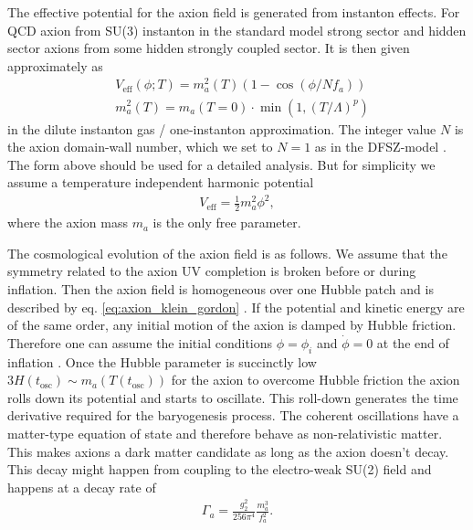 \documentclass[13pt,a4paper,titlepage]{article}
\begin{document}
The effective potential for the axion field is generated from instanton effects.
For QCD axion from SU(3) instanton in the standard model strong sector and hidden sector axions from some hidden strongly coupled sector. It is then given approximately as \cite[sec. 2.2]{Axion_Cosmology_Marsh_2016}
\begin{align}
   &V_\mathrm{eff}(\phi; T) = m_a^2(T) (1 - \cos(\phi / N f_a)) \\
   &m_a^2(T) = m_a(T = 0) \cdot \min\left(1, \left( T / \Lambda \right)^p \right)
\end{align}
in the dilute instanton gas / one-instanton approximation.
The integer value $N$ is the axion domain-wall number, which we set to $N = 1$ as in the DFSZ-model \cite[sec. 2.7]{Di_Luzio_2020_Landscape_of_QCD_Axion_models}.
The form above should be used for a detailed analysis. But for simplicity we assume a temperature independent harmonic potential
\begin{align}
    V_\mathrm{eff} = \frac{1}{2} m_a^2 \phi^2,
\end{align}
where the axion mass $m_a$ is the only free parameter.

\noindent
The cosmological evolution of the axion field is as follows. We assume that the
symmetry related to the axion UV completion is broken before or during inflation.
Then the axion field is homogeneous over one Hubble patch and is described by eq. \eqref{eq:axion_klein_gordon} \cite[sec. 4, eps. 4.7]{Axion_Cosmology_Marsh_2016}.
If the potential and kinetic energy are of the same order, any initial motion of the axion is damped by Hubble friction. Therefore one can assume the initial conditions $\phi = \phi_i$ and $\dot{\phi} = 0$ at the end of inflation \cite[sec. IV.A]{Axion_cosmology_Wantz_2010}.
Once the Hubble parameter is succinctly low $3 H(t_\mathrm{osc}) \sim m_a(T(t_\mathrm{osc}))$ for the axion to overcome Hubble friction the axion rolls down its potential and starts to oscillate. This roll-down generates the time derivative
required for the baryogenesis process.
The coherent oscillations have a matter-type equation of state and therefore behave as non-relativistic matter. This makes axions a dark matter candidate as long as the axion
doesn't decay.
This decay might happen from coupling to the electro-weak SU(2) field and happens at a decay rate of \cite[eq. 15]{Axion_leptogenesis_Kusenko_2015}
\begin{align}
    \Gamma_a = \frac{g_2^2}{256 \pi^4} \frac{m_a^3}{f_a^2}.
\end{align}
\end{document}
